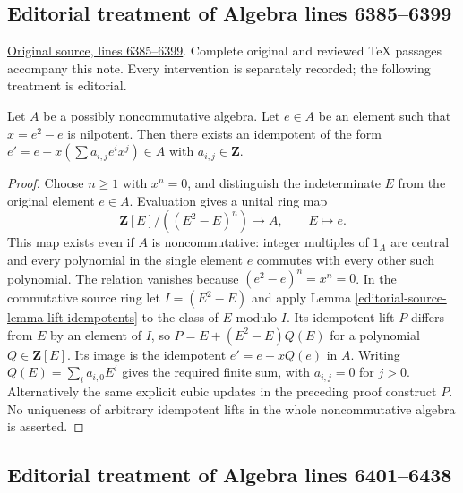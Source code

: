 \subsection{Editorial treatment of Algebra lines 6385--6399}

\hypertarget{algebra-context-050}{}

\noindent\href{https://github.com/stacks/stacks-project/blob/a04446e57ec1fbc252a871afcec7752fb2807b14/algebra.tex\#L6385}{Original source, lines 6385--6399}. Complete original and reviewed TeX passages accompany this note. Every intervention is separately recorded; the following treatment is editorial.


\begin{lemma}
\label{editorial-source-lemma-lift-idempotents-noncommutative}
Let $A$ be a possibly noncommutative algebra.
Let $e \in A$ be an element such that $x = e^2 - e$ is nilpotent.
Then there exists an idempotent of the form
$e' = e + x(\sum a_{i, j}e^ix^j) \in A$
with $a_{i, j} \in \mathbf{Z}$.
\end{lemma}

\begin{proof}
Choose $n\geq1$ with $x^n=0$, and distinguish the indeterminate
$E$ from the original element $e\in A$. Evaluation gives a unital
ring map
$$
\mathbf Z[E]/((E^2-E)^n)\longrightarrow A,\qquad E\longmapsto e.
$$
This map exists even if $A$ is noncommutative: integer multiples of
$1_A$ are central and every polynomial in the single element $e$
commutes with every other such polynomial. The relation vanishes
because $(e^2-e)^n=x^n=0$.
In the commutative source ring let $I=(E^2-E)$ and apply
Lemma \ref{editorial-source-lemma-lift-idempotents} to the class of $E$ modulo $I$.
Its idempotent lift $P$ differs from $E$ by an element of $I$,
so $P=E+(E^2-E)Q(E)$ for a polynomial $Q\in\mathbf Z[E]$.
Its image is the idempotent $e'=e+xQ(e)$ in $A$.
Writing $Q(E)=\sum_i a_{i,0}E^i$ gives the required finite sum,
with $a_{i,j}=0$ for $j>0$. Alternatively the same explicit cubic
updates in the preceding proof construct $P$. No uniqueness of
arbitrary idempotent lifts in the whole noncommutative algebra is asserted.
\end{proof}


\subsection{Editorial treatment of Algebra lines 6401--6438}

\hypertarget{algebra-context-051}{}

